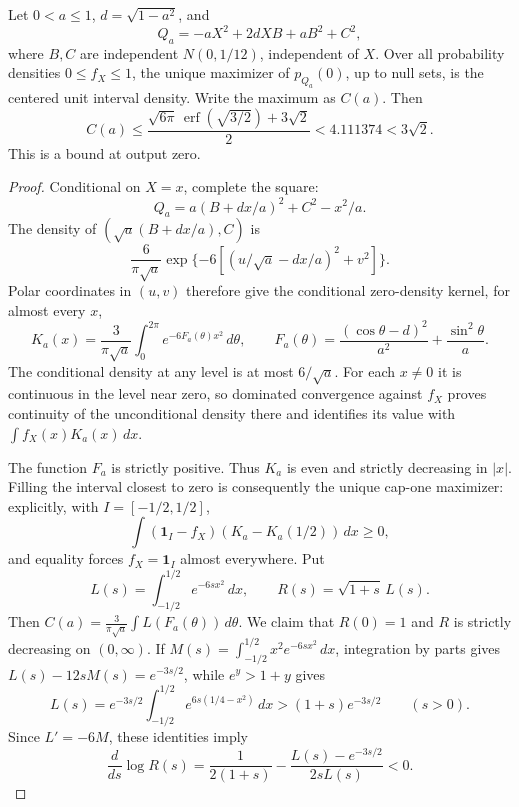 \begin{theorem}\label{bench:one-heavy}
Let \(0<a\leq1\), \(d=\sqrt{1-a^2}\), and
\[
 Q_a=-aX^2+2dXB+aB^2+C^2,
\]
where \(B,C\) are independent \(N(0,1/12)\), independent of \(X\).
Over all probability densities \(0\leq f_X\leq1\), the unique
maximizer of \(p_{Q_a}(0)\), up to null sets, is the centered unit
interval density.  Write the maximum as \(C(a)\).  Then
\begin{equation}\label{bench:one-heavy-bound}
 C(a)\leq
 \frac{\sqrt{6\pi}\,\operatorname{erf}(\sqrt{3/2})+3\sqrt2}{2}
 <4.111374<3\sqrt2.
\end{equation}
This is a bound at output zero.
\end{theorem}
\begin{proof}
Conditional on \(X=x\), complete the square:
\[
 Q_a=a(B+dx/a)^2+C^2-x^2/a.
\]
The density of \((\sqrt a(B+dx/a),C)\) is
\[
 \frac6{\pi\sqrt a}
       \exp\{-6[(u/\sqrt a-dx/a)^2+v^2]\}.
\]
Polar coordinates in \((u,v)\) therefore give the conditional
zero-density kernel, for almost every \(x\),
\begin{equation}\label{bench:heavy-kernel}
 K_a(x)=\frac3{\pi\sqrt a}\int_0^{2\pi}
                      e^{-6F_a(\theta)x^2}\,d\theta,
 \qquad
 F_a(\theta)=\frac{(\cos\theta-d)^2}{a^2}
                         +\frac{\sin^2\theta}{a}.
\end{equation}
The conditional density at any level is at most \(6/\sqrt a\).
For each \(x\ne0\) it is continuous in the level near zero, so
dominated convergence against \(f_X\) proves continuity of the
unconditional density there and identifies its value with
\(\int f_X(x)K_a(x)\,dx\).

The function \(F_a\) is strictly positive.  Thus \(K_a\) is even
and strictly decreasing in \(|x|\).  Filling the interval closest to
zero is consequently the unique cap-one maximizer: explicitly, with
\(I=[-1/2,1/2]\),
\[
 \int (\mathbf1_I-f_X)(K_a-K_a(1/2))\,dx\geq0,
\]
and equality forces \(f_X=\mathbf1_I\) almost everywhere.  Put
\[
 L(s)=\int_{-1/2}^{1/2}e^{-6sx^2}\,dx,
 \qquad R(s)=\sqrt{1+s}\,L(s).
\]
Then \(C(a)=\frac3{\pi\sqrt a}\int L(F_a(\theta))\,d\theta\).
We claim that \(R(0)=1\) and \(R\) is strictly decreasing on
\((0,\infty)\).  If
\(M(s)=\int_{-1/2}^{1/2}x^2e^{-6sx^2}\,dx\), integration by parts
gives \(L(s)-12sM(s)=e^{-3s/2}\), while \(e^y>1+y\) gives
\[
 L(s)=e^{-3s/2}\int_{-1/2}^{1/2}e^{6s(1/4-x^2)}\,dx
       >(1+s)e^{-3s/2}\qquad(s>0).
\]
Since \(L'=-6M\), these identities imply
\[
 \frac{d}{ds}\log R(s)
 =\frac1{2(1+s)}-
        \frac{L(s)-e^{-3s/2}}{2sL(s)}<0.
\]


\end{proof}
